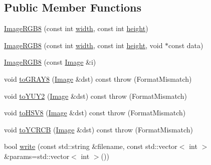 \subsection*{Public Member Functions}
\begin{DoxyCompactItemize}
\item 
\hyperlink{classcolorspaces_1_1_image_r_g_b8_abd15a24925b09fe2ae1f89f9a095b6a8}{Image\+R\+G\+B8} (const int \hyperlink{classcolorspaces_1_1_image_ab80af7d4797110c23ed575b329ec7c4f}{width}, const int \hyperlink{classcolorspaces_1_1_image_a99a05ebd37f61215b2c3042ecaefdbfc}{height})
\item 
\hyperlink{classcolorspaces_1_1_image_r_g_b8_a17e496d63e4c4c32893746fefe75ae9a}{Image\+R\+G\+B8} (const int \hyperlink{classcolorspaces_1_1_image_ab80af7d4797110c23ed575b329ec7c4f}{width}, const int \hyperlink{classcolorspaces_1_1_image_a99a05ebd37f61215b2c3042ecaefdbfc}{height}, void $\ast$const data)
\item 
\hyperlink{classcolorspaces_1_1_image_r_g_b8_acab57fcfbc442b4106636d174fea3b7c}{Image\+R\+G\+B8} (const \hyperlink{classcolorspaces_1_1_image}{Image} \&i)
\item 
void \hyperlink{classcolorspaces_1_1_image_r_g_b8_ae8e43feb2e6c2139d11e0a4501006fb9}{to\+G\+R\+A\+Y8} (\hyperlink{classcolorspaces_1_1_image}{Image} \&dst) const  throw (\+Format\+Mismatch)
\item 
void \hyperlink{classcolorspaces_1_1_image_r_g_b8_a772fef2f0a193a41a2fab83caf2a2251}{to\+Y\+U\+Y2} (\hyperlink{classcolorspaces_1_1_image}{Image} \&dst) const  throw (\+Format\+Mismatch)
\item 
void \hyperlink{classcolorspaces_1_1_image_r_g_b8_a7abf7473312776fffdd2aeca422c62ff}{to\+H\+S\+V8} (\hyperlink{classcolorspaces_1_1_image}{Image} \&dst) const  throw (\+Format\+Mismatch)
\item 
void \hyperlink{classcolorspaces_1_1_image_r_g_b8_afd40b7e2468a59bd82bd307e5ab55224}{to\+Y\+C\+R\+CB} (\hyperlink{classcolorspaces_1_1_image}{Image} \&dst) const  throw (\+Format\+Mismatch)
\item 
bool \hyperlink{classcolorspaces_1_1_image_r_g_b8_a60d5b941b146bbe8b5f6fcee197393ae}{write} (const std\+::string \&filename, const std\+::vector$<$ int $>$ \&params=std\+::vector$<$ int $>$())
\end{DoxyCompactItemize}
